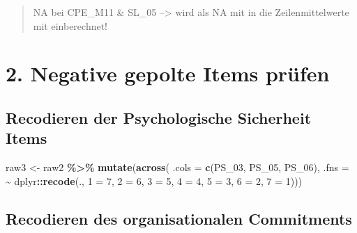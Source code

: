 \documentclass[
]{article}
\newenvironment{Shaded}{\begin{snugshade}}{\end{snugshade}}
\newcommand{\AttributeTok}[1]{\textcolor[rgb]{0.13,0.29,0.53}{#1}}
\newcommand{\DecValTok}[1]{\textcolor[rgb]{0.00,0.00,0.81}{#1}}
\newcommand{\FunctionTok}[1]{\textcolor[rgb]{0.13,0.29,0.53}{\textbf{#1}}}
\newcommand{\NormalTok}[1]{#1}
\newcommand{\OtherTok}[1]{\textcolor[rgb]{0.56,0.35,0.01}{#1}}
\newcommand{\SpecialCharTok}[1]{\textcolor[rgb]{0.81,0.36,0.00}{\textbf{#1}}}
\newcommand{\StringTok}[1]{\textcolor[rgb]{0.31,0.60,0.02}{#1}}
\begin{document}
\begin{quote}
NA bei CPE\_M11 \& SL\_05 --\textgreater{} wird als NA mit in die
Zeilenmittelwerte mit einberechnet!
\end{quote}

\section{2. Negative gepolte Items
prüfen}\label{negative-gepolte-items-pruxfcfen}

\subsection{Recodieren der Psychologische Sicherheit
Items}\label{recodieren-der-psychologische-sicherheit-items}

\begin{Shaded}
\begin{Highlighting}[]
\NormalTok{raw3 }\OtherTok{\textless{}{-}}\NormalTok{ raw2 }\SpecialCharTok{\%\textgreater{}\%} 
  \FunctionTok{mutate}\NormalTok{(}\FunctionTok{across}\NormalTok{(}
    \AttributeTok{.cols =} \FunctionTok{c}\NormalTok{(PS\_03, PS\_05, PS\_06),}
    \AttributeTok{.fns =} \SpecialCharTok{\textasciitilde{}}\NormalTok{ dplyr}\SpecialCharTok{::}\FunctionTok{recode}\NormalTok{(.,}
                    \StringTok{\textasciigrave{}}\AttributeTok{1}\StringTok{\textasciigrave{}} \OtherTok{=} \DecValTok{7}\NormalTok{,}
                    \StringTok{\textasciigrave{}}\AttributeTok{2}\StringTok{\textasciigrave{}} \OtherTok{=} \DecValTok{6}\NormalTok{,}
                    \StringTok{\textasciigrave{}}\AttributeTok{3}\StringTok{\textasciigrave{}} \OtherTok{=} \DecValTok{5}\NormalTok{,}
                    \StringTok{\textasciigrave{}}\AttributeTok{4}\StringTok{\textasciigrave{}} \OtherTok{=} \DecValTok{4}\NormalTok{,}
                    \StringTok{\textasciigrave{}}\AttributeTok{5}\StringTok{\textasciigrave{}} \OtherTok{=} \DecValTok{3}\NormalTok{,}
                    \StringTok{\textasciigrave{}}\AttributeTok{6}\StringTok{\textasciigrave{}} \OtherTok{=} \DecValTok{2}\NormalTok{,}
                    \StringTok{\textasciigrave{}}\AttributeTok{7}\StringTok{\textasciigrave{}} \OtherTok{=} \DecValTok{1}\NormalTok{)))}
\end{Highlighting}
\end{Shaded}

\subsection{Recodieren des organisationalen
Commitments}\label{recodieren-des-organisationalen-commitments}
\end{document}
